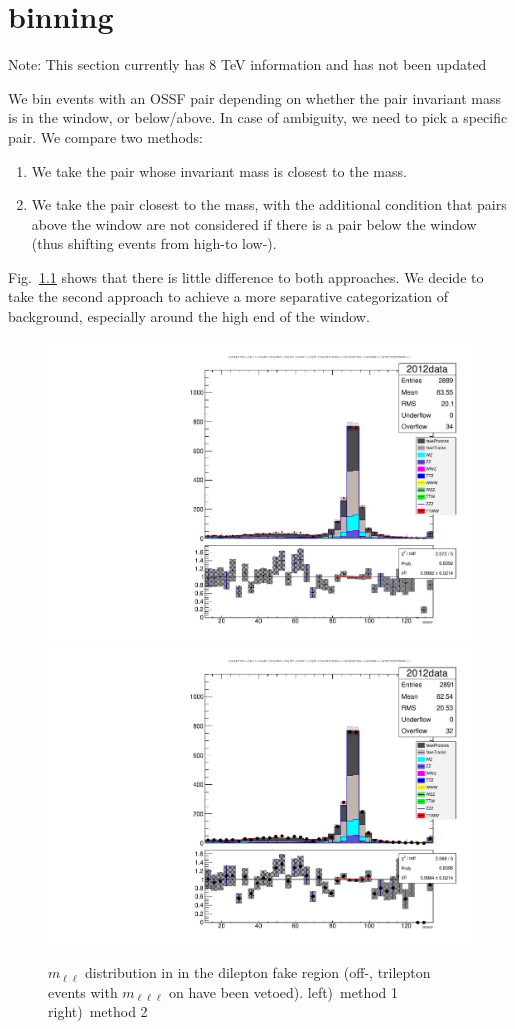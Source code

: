 \chapter{\texorpdfstring{\Z}{Z} binning}
\label{app:Zbinning}
Note: This section currently has 8 TeV information and has not been updated

We bin events with an OSSF pair depending on whether the pair invariant mass is in the \Z window, or below/above. In case of ambiguity, we need to pick a specific pair. We compare two methods:
\begin{enumerate}
	\item We take the pair whose invariant mass is closest to the \Z mass.
	\item We take the pair closest to the \Z mass, with the additional condition that pairs above the \Z window are not considered if there is a pair below the \Z window (thus shifting events from high-\Z to low-\Z).
\end{enumerate}
Fig.~\ref{fig:app:Zbinning} shows that there is little difference to both approaches. We decide to take the second approach to achieve a more separative categorization of background, especially around the high end of the \Z window.

\begin{figure}
\begin{center}
	\includegraphics[width=.5\textwidth]{Appendix/Z_NOTTRILEPTONONZ_oldMOSSF}%
	\includegraphics[width=.5\textwidth]{Appendix/Z_NOTTRILEPTONONZ_MOSSF}
	\caption{$m_{\ell\ell}$ distribution in in the dilepton fake region (off-\Z, trilepton events with $m_{\ell\ell\ell}$ on \Z have been vetoed). \enskip left)~method 1 \enskip right)~method 2
	\label{fig:app:Zbinning}}
\end{center}
\end{figure}
